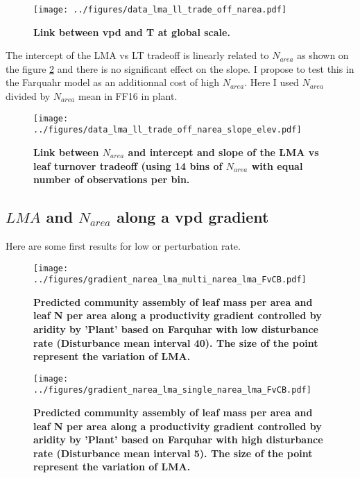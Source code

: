 \documentclass[a4paper,11pt]{article}
\begin{document}
\begin{figure}[ht]
\centering
\texttt{[image: ../figures/data\_lma\_ll\_trade\_off\_narea.pdf]}
\caption{\textbf{Link between vpd and T at global scale.}
\label{fig:narea_tradeoff}}
\end{figure}

The intercept of the LMA vs LT tradeoff is linearly related to $N_{area}$ as shown on the figure \ref{fig:narea_intercept} and there is no significant effect on the slope. I propose to test this in the Farquahr model as an additionnal cost of high $N_{area}$.  Here I used $N_{area}$ divided by $N_{area}$ mean in FF16 in plant. 

\begin{figure}[ht]
\centering
\texttt{[image: ../figures/data\_lma\_ll\_trade\_off\_narea\_slope\_elev.pdf]}
\caption{\textbf{Link between $N_{area}$ and intercept and slope of the LMA vs leaf turnover tradeoff (using 14 bins of $N_{area}$ with equal number of observations per bin.}
\label{fig:narea_intercept}}
\end{figure}


\clearpage

\subsection{$LMA$ and $N_{area}$ along a vpd gradient}

Here are some first results for low or perturbation rate.

\begin{figure}[ht]
\centering
\texttt{[image: ../figures/gradient\_narea\_lma\_multi\_narea\_lma\_FvCB.pdf]}
\caption{\textbf{Predicted community assembly of leaf mass per area and leaf N per area along a productivity gradient controlled by aridity by 'Plant' based on Farquhar with low disturbance rate (Disturbance mean interval 40). The size of the point represent the variation of LMA.}
\label{fig:lma_nareaFl}}
\end{figure}


\begin{figure}[ht]
\centering
\texttt{[image: ../figures/gradient\_narea\_lma\_single\_narea\_lma\_FvCB.pdf]}
\caption{\textbf{Predicted community assembly of leaf mass per area and leaf N per area along a productivity gradient controlled by aridity by 'Plant' based on Farquhar with high disturbance rate (Disturbance mean interval 5). The size of the point represent the variation of LMA.}
\label{fig:lma_nareaFh}}
\end{figure}
\end{document}

